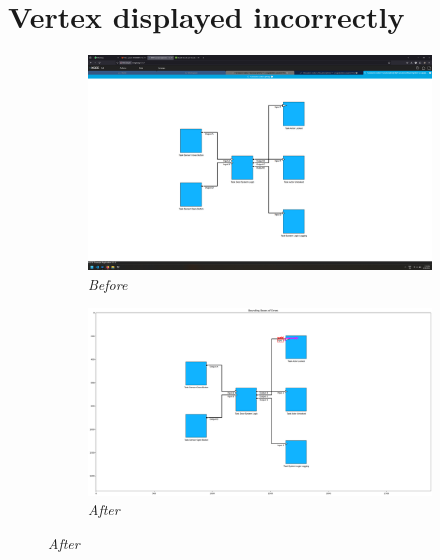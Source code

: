 \documentclass{article}
\begin{document}
\section{Vertex displayed incorrectly}
\begin{figure}[H]
    \centering
    \begin{subfigure}[t]{0.9\textwidth}
        \centering
        \includegraphics[width=\textwidth]{testcases/vertex_displayed_incorrectly/141215-507428_input_image.png}
        \caption*{\textit{Before}}
    \end{subfigure}
    \newline
    \begin{subfigure}[t]{0.9\textwidth}
        \centering
        \includegraphics[width=\textwidth]{testcases/vertex_displayed_incorrectly/141236-249257_element_bbox_errors_labeled_colored.png}
        \caption*{\textit{After}}
    \end{subfigure}
    \label{fig:vertex_displayed_incorrectly}
\end{figure}
\newpage
\end{document}
